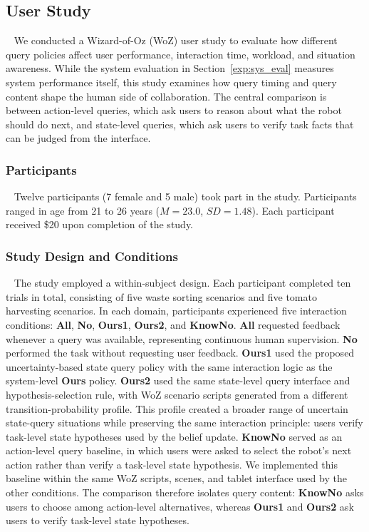 \subsection{User Study}~\label{exp:user_study}
We conducted a Wizard-of-Oz (WoZ) user study to evaluate how different query policies affect user performance, interaction time, workload, and situation awareness. While the system evaluation in Section~\ref{exp:sys_eval} measures system performance itself, this study examines how query timing and query content shape the human side of collaboration. The central comparison is between action-level queries, which ask users to reason about what the robot should do next, and state-level queries, which ask users to verify task facts that can be judged from the interface.

\subsubsection{Participants}~\label{user:participants}
Twelve participants (7 female and 5 male) took part in the study. Participants ranged in age from 21 to 26 years ($M=23.0$, $SD=1.48$). Each participant received \$20 upon completion of the study.

\subsubsection{Study Design and Conditions}~\label{user:design}
The study employed a within-subject design. Each participant completed ten trials in total, consisting of five waste sorting scenarios and five tomato harvesting scenarios. In each domain, participants experienced five interaction conditions: \textbf{All}, \textbf{No}, \textbf{Ours1}, \textbf{Ours2}, and \textbf{KnowNo}. \textbf{All} requested feedback whenever a query was available, representing continuous human supervision. \textbf{No} performed the task without requesting user feedback. \textbf{Ours1} used the proposed uncertainty-based state query policy with the same interaction logic as the system-level \textbf{Ours} policy. \textbf{Ours2} used the same state-level query interface and hypothesis-selection rule, with WoZ scenario scripts generated from a different transition-probability profile. This profile created a broader range of uncertain state-query situations while preserving the same interaction principle: users verify task-level state hypotheses used by the belief update. \textbf{KnowNo} served as an action-level query baseline, in which users were asked to select the robot's next action rather than verify a task-level state hypothesis. We implemented this baseline within the same WoZ scripts, scenes, and tablet interface used by the other conditions. The comparison therefore isolates query content: \textbf{KnowNo} asks users to choose among action-level alternatives, whereas \textbf{Ours1} and \textbf{Ours2} ask users to verify task-level state hypotheses.

